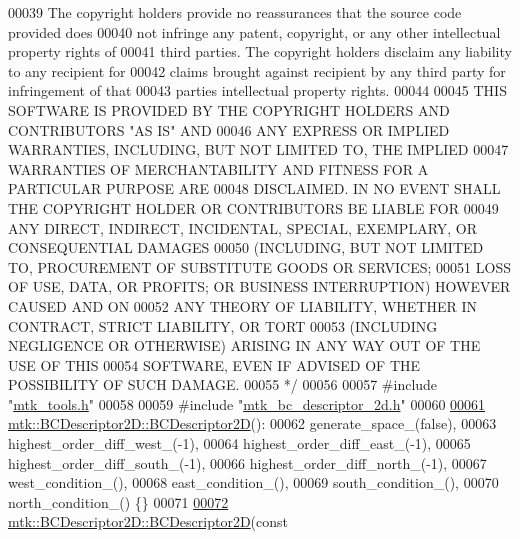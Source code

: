 \begin{DoxyCode}
00039 \textcolor{comment}{The copyright holders provide no reassurances that the source code provided does}
00040 \textcolor{comment}{not infringe any patent, copyright, or any other intellectual property rights of}
00041 \textcolor{comment}{third parties. The copyright holders disclaim any liability to any recipient for}
00042 \textcolor{comment}{claims brought against recipient by any third party for infringement of that}
00043 \textcolor{comment}{parties intellectual property rights.}
00044 \textcolor{comment}{}
00045 \textcolor{comment}{THIS SOFTWARE IS PROVIDED BY THE COPYRIGHT HOLDERS AND CONTRIBUTORS "AS IS" AND}
00046 \textcolor{comment}{ANY EXPRESS OR IMPLIED WARRANTIES, INCLUDING, BUT NOT LIMITED TO, THE IMPLIED}
00047 \textcolor{comment}{WARRANTIES OF MERCHANTABILITY AND FITNESS FOR A PARTICULAR PURPOSE ARE}
00048 \textcolor{comment}{DISCLAIMED. IN NO EVENT SHALL THE COPYRIGHT HOLDER OR CONTRIBUTORS BE LIABLE FOR}
00049 \textcolor{comment}{ANY DIRECT, INDIRECT, INCIDENTAL, SPECIAL, EXEMPLARY, OR CONSEQUENTIAL DAMAGES}
00050 \textcolor{comment}{(INCLUDING, BUT NOT LIMITED TO, PROCUREMENT OF SUBSTITUTE GOODS OR SERVICES;}
00051 \textcolor{comment}{LOSS OF USE, DATA, OR PROFITS; OR BUSINESS INTERRUPTION) HOWEVER CAUSED AND ON}
00052 \textcolor{comment}{ANY THEORY OF LIABILITY, WHETHER IN CONTRACT, STRICT LIABILITY, OR TORT}
00053 \textcolor{comment}{(INCLUDING NEGLIGENCE OR OTHERWISE) ARISING IN ANY WAY OUT OF THE USE OF THIS}
00054 \textcolor{comment}{SOFTWARE, EVEN IF ADVISED OF THE POSSIBILITY OF SUCH DAMAGE.}
00055 \textcolor{comment}{*/}
00056 
00057 \textcolor{preprocessor}{#include "\hyperlink{mtk__tools_8h}{mtk\_tools.h}"}
00058 
00059 \textcolor{preprocessor}{#include "\hyperlink{mtk__bc__descriptor__2d_8h}{mtk\_bc\_descriptor\_2d.h}"}
00060 
\hypertarget{mtk__bc__descriptor__2d_8cc_source_l00061}{}\hyperlink{classmtk_1_1BCDescriptor2D_abbc3af29202dbfef203f4cafd9566fd0}{00061} \hyperlink{classmtk_1_1BCDescriptor2D_abbc3af29202dbfef203f4cafd9566fd0}{mtk::BCDescriptor2D::BCDescriptor2D}():
00062   generate\_space\_(false),
00063   highest\_order\_diff\_west\_(-1),
00064   highest\_order\_diff\_east\_(-1),
00065   highest\_order\_diff\_south\_(-1),
00066   highest\_order\_diff\_north\_(-1),
00067   west\_condition\_(),
00068   east\_condition\_(),
00069   south\_condition\_(),
00070   north\_condition\_() \{\}
00071 
\hypertarget{mtk__bc__descriptor__2d_8cc_source_l00072}{}\hyperlink{classmtk_1_1BCDescriptor2D_ae8a93352a94efed52747b710e6ff7893}{00072} \hyperlink{classmtk_1_1BCDescriptor2D_abbc3af29202dbfef203f4cafd9566fd0}{mtk::BCDescriptor2D::BCDescriptor2D}(\textcolor{keyword}{const} 

\end{DoxyCode}

